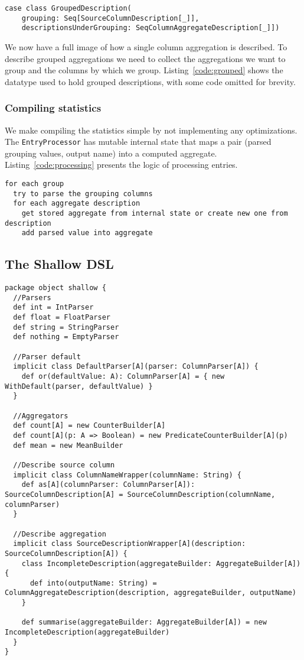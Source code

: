 \begin{lstlisting}[caption=GroupedDescription, label=code:grouped]
case class GroupedDescription(
	grouping: Seq[SourceColumnDescription[_]],
	descriptionsUnderGrouping: SeqColumnAggregateDescription[_]])
\end{lstlisting}

We now have a full image of how a single column aggregation is described.
To describe grouped aggregations we need to collect the aggregations we want to group and the columns by which we group.
Listing~\ref{code:grouped} shows the datatype used to hold grouped descriptions, with some code omitted for brevity.

\subsubsection{Compiling statistics}
We make compiling the statistics simple by not implementing any optimizations.
The \texttt{EntryProcessor} has mutable internal state that maps a pair (parsed grouping values, output name) into a computed aggregate.
Listing~\ref{code:processing} presents the logic of processing entries.

\begin{lstlisting}[caption=Processing entries, label=code:processing]
for each group
  try to parse the grouping columns
  for each aggregate description
    get stored aggregate from internal state or create new one from description
    add parsed value into aggregate
\end{lstlisting}

\subsection{The Shallow DSL}

\begin{lstlisting}[caption=shallow package object, label=code:shallow, float]
package object shallow {
  //Parsers
  def int = IntParser
  def float = FloatParser
  def string = StringParser
  def nothing = EmptyParser

  //Parser default
  implicit class DefaultParser[A](parser: ColumnParser[A]) {
    def or(defaultValue: A): ColumnParser[A] = { new WithDefault(parser, defaultValue) }
  }

  //Aggregators
  def count[A] = new CounterBuilder[A]
  def count[A](p: A => Boolean) = new PredicateCounterBuilder[A](p)
  def mean = new MeanBuilder

  //Describe source column
  implicit class ColumnNameWrapper(columnName: String) {
    def as[A](columnParser: ColumnParser[A]): SourceColumnDescription[A] = SourceColumnDescription(columnName, columnParser)
  }

  //Describe aggregation
  implicit class SourceDescriptionWrapper[A](description: SourceColumnDescription[A]) {
    class IncompleteDescription(aggregateBuilder: AggregateBuilder[A]) {
      def into(outputName: String) = ColumnAggregateDescription(description, aggregateBuilder, outputName)
    }

    def summarise(aggregateBuilder: AggregateBuilder[A]) = new IncompleteDescription(aggregateBuilder)
  }
}
\end{lstlisting}

